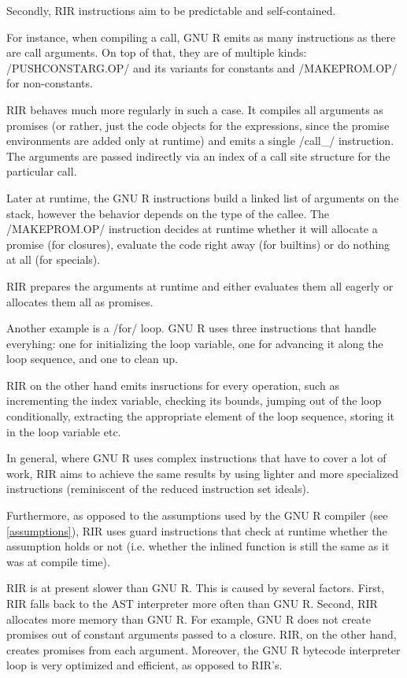 Secondly, RIR instructions aim to be predictable and self-contained.

For instance, when compiling a call, GNU R emits as many instructions as there are call arguments. On top of that, they are of multiple kinds: \rinline/PUSHCONSTARG.OP/ and its variants for constants and \rinline/MAKEPROM.OP/ for non-constants.

RIR behaves much more regularly in such a case. It compiles all arguments as promises (or rather, just the code objects for the expressions, since the promise environments are added only at runtime) and emits a single \cinline/call_/ instruction. The arguments are passed indirectly via an index of a call site structure for the particular call.

Later at runtime, the GNU R instructions build a linked list of arguments on the stack, however the behavior depends on the type of the callee. The \rinline/MAKEPROM.OP/ instruction decides at runtime whether it will allocate a promise (for closures), evaluate the code right away (for builtins) or do nothing at all (for specials).

RIR prepares the arguments at runtime and either evaluates them all eagerly or allocates them all as promises.

Another example is a \rinline/for/ loop. GNU R uses three instructions that handle everyhing: one for initializing the loop variable, one for advancing it along the loop sequence, and one to clean up.

RIR on the other hand emits insructions for every operation, such as incrementing the index variable, checking its bounds, jumping out of the loop conditionally, extracting the appropriate element of the loop sequence, storing it in the loop variable etc.

In general, where GNU R uses complex instructions that have to cover a lot of work, RIR aims to achieve the same results by using lighter and more specialized instructions (reminiscent of the reduced instruction set ideals).

Furthermore, as opposed to the assumptions used by the GNU R compiler (see \ref{assumptions}), RIR uses guard instructions that check at runtime whether the assumption holds or not (i.e. whether the inlined function is still the same as it was at compile time).

RIR is at present slower than GNU R. This is caused by several factors. First, RIR falls back to the AST interpreter more often than GNU R. Second, RIR allocates more memory than GNU R. For example, GNU R does not create promises out of constant arguments passed to a closure. RIR, on the other hand, creates promises from each argument. Moreover, the GNU R bytecode interpreter loop is very optimized and efficient, as opposed to RIR's.

